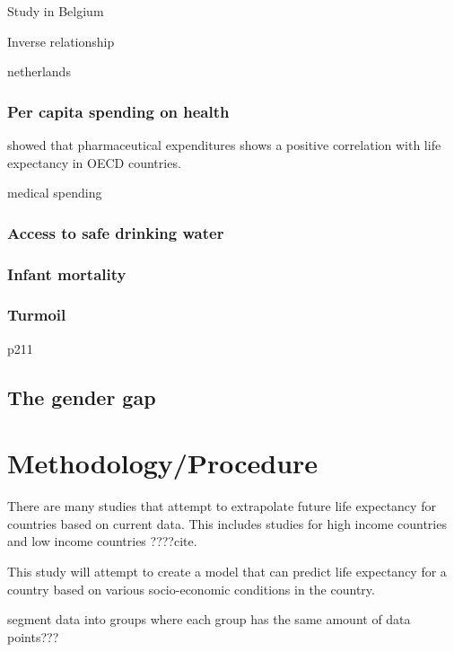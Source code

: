 \documentclass[10pt,a4paper]{article}
\begin{document}
Study in Belgium \cite{Deboosere2009}


Inverse relationship  \cite{Hoque2019}

netherlands \cite{VanKippersluis2009}

\cite{VanBaal2016a}

\subsubsection{Per capita spending on health}

\cite{Shaw2005} showed that pharmaceutical expenditures shows a positive correlation with life expectancy in OECD countries.

medical spending \cite{Cutler2006}

\subsubsection{Access to safe drinking water}

\subsubsection{Infant mortality}

\cite{CDC1999}

\subsubsection{Turmoil}
\citep{Low2008} p211

\subsection{The gender gap}

\cite{Rochelle2015}

\section{Methodology/Procedure}

There are many studies that attempt to extrapolate future life expectancy for countries based on current data. This includes studies for high income countries \citep{Kontis2017} and low income countries ????{cite}.

This study will attempt to create a model that can predict life expectancy for a country based on various socio-economic conditions in the country.



segment data into groups where each group has the same amount of data points???
\end{document}
